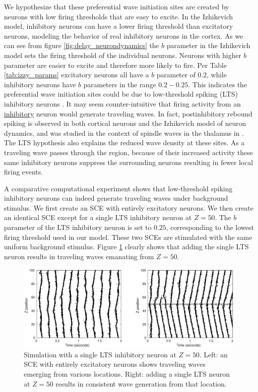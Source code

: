 \documentclass[12pt]{article}
\begin{document}
We hypothesize that these preferential wave initiation sites are created by neurons with low firing thresholds that are easy to excite.
In the Izhikevich model, inhibitory neurons can have a lower firing threshold than excitatory neurons, modeling the behavior of real inhibitory neurons in the cortex\parencite{gibson2009}\parencite{hayut2011}.
As we can see from figure \ref{fig:delay_neurondynamics}  the $b$ parameter in the Izhikevich model sets the firing threshold of the individual neurons.
Neurons with higher $b$ parameter are easier to excite and therefore more likely to fire.
Per Table \ref{tab:izzy_params} excitatory neurons all have a $b$ parameter of $0.2$, while inhibitory neurons have $b$ parameters in the range $0.2-0.25$.
This indicates the preferential wave initiation sites could be due to low-threshold spiking (LTS) inhibitory neurons \parencite{izhikevich2003}.
It may seem counter-intuitive that firing activity from an \underline{inhibitory} neuron would generate traveling waves.
In fact, postinhibitory rebound spiking is observed in both cortical neurons \parencite{ascoli2010} and the Izhikevich model of neuron dynamics,  and was studied in the context of spindle waves in the thalamus in \parencite{Golomb1996}.
The LTS hypothesis also explains the reduced wave density at these sites.
As a traveling wave passes through the region, because of their increased activity these same inhibitory neurons suppress the surrounding neurons resulting in fewer local firing events.

A comparative computational experiment shows that low-threshold spiking inhibitory neurons can indeed generate traveling waves under background stimulus.
We first create an SCE with entirely excitatory neurons.
We then create an identical SCE except for a single LTS inhibitory neuron at $Z=50$.
The $b$ parameter of the LTS inhibitory neuron is set to $0.25$, corresponding to the lowest firing threshold used in our model.
These two SCEs are stimulated with the same uniform background stimulus. 
Figure \ref{fig:lts_inhibit} clearly shows that adding the single LTS neuron results in traveling waves emanating from $Z=50$. 
\begin{figure}[!htb]
 \caption{Simulation with a single LTS inhibitory neuron at $Z=50$. Left: an SCE with entirely excitatory neurons shows traveling waves emerging from various locations. Right: adding a single LTS neuron at $Z=50$ results in consistent wave generation from that location. }
 \label{fig:lts_inhibit}
 \centering
   \includegraphics[width=\textwidth]{fig/SingleLTSInhibit}
\end{figure}
\end{document}

